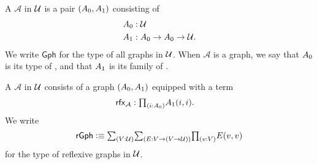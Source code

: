 \begin{defn}\label{defn:graphs_ctx}
A  $\mathcal{A}$ in $\mathcal{U}$ is a pair $\pairr{\pts{A},\edg{A}}$ consisting of
\begin{align*}
\pts{A} & : \UU \\
\edg{A} & : \pts{A}\to\pts{A}\to\UU.
\end{align*}
We write $\mathsf{Gph}$ for the type of all graphs in $\mathcal{U}$. When $\mathcal{A}$ is a graph, we say that $\pts{A}$ is its type of , and that $\edg{A}$ is its family of .

A  $\mathcal{A}$ in $\mathcal{U}$ consists of a graph $(\pts{A},\edg{A})$ equipped with a  term
\begin{align*}
\rfx{\mathcal{A}} & : \prd{i:\pts{A}}\edg{A}(i,i).
\end{align*}
We write
\begin{equation*}
\mathsf{rGph}\defeq \sm{V:\UU}{E:V\to (V\to\UU)}\prd{v:V}E(v,v)
\end{equation*}
for the type of reflexive graphs in $\mathcal{U}$. 
\end{defn}


